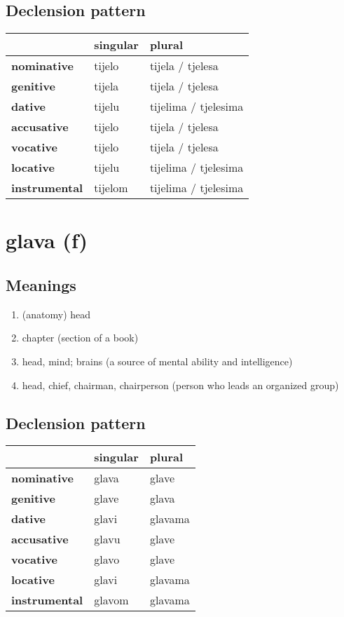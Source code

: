 \subsection*{Declension pattern}
\begin{tabularx}{\linewidth}{Xll}
\toprule
{} & singular &                plural \\
\midrule
\textbf{nominative  } &   tijelo &      tijela / tjelesa \\
\textbf{genitive    } &   tijela &      tijela / tjelesa \\
\textbf{dative      } &   tijelu &  tijelima / tjelesima \\
\textbf{accusative  } &   tijelo &      tijela / tjelesa \\
\textbf{vocative    } &   tijelo &      tijela / tjelesa \\
\textbf{locative    } &   tijelu &  tijelima / tjelesima \\
\textbf{instrumental} &  tijelom &  tijelima / tjelesima \\
\bottomrule
\end{tabularx}

\filbreak
\section{glava (f)}
\subsection*{Meanings}
\begin{enumerate}
\item (anatomy) head
\item chapter (section of a book)
\item head, mind; brains (a source of mental ability and intelligence)
\item head, chief, chairman, chairperson (person who leads an organized group)
\end{enumerate}
\subsection*{Declension pattern}
\begin{tabularx}{\linewidth}{Xll}
\toprule
{} & singular &   plural \\
\midrule
\textbf{nominative  } &    glava &    glave \\
\textbf{genitive    } &    glave &    glava \\
\textbf{dative      } &    glavi &  glavama \\
\textbf{accusative  } &    glavu &    glave \\
\textbf{vocative    } &    glavo &    glave \\
\textbf{locative    } &    glavi &  glavama \\
\textbf{instrumental} &   glavom &  glavama \\
\bottomrule
\end{tabularx}

